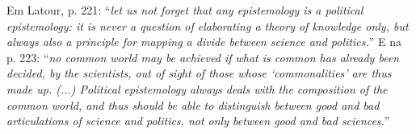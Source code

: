 Em Latour, p. 221: \enquote{\textit{let us not forget that any epistemology is a political epistemology: it is never a question of elaborating a theory of knowledge only, but always also a principle for mapping a divide between science and politics.}} E na p. 223: \enquote{\textit{no common world may be achieved if what is common has already been decided, by the scientists, out of sight of those whose \enquote{commonalities} are thus made up. (...) Political epistemology always deals with the composition of the common world, and thus should be able to distinguish between good and bad articulations of science and politics, not only between good and bad sciences.}}